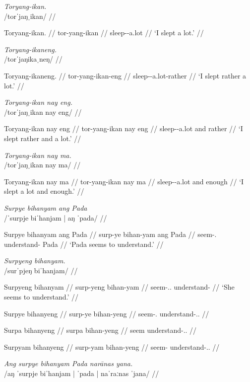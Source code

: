 \documentclass[12pt,a4paper]{scrartcl}
\newcommand{\TsgF}{{\Tsg}.{\F}}
\begin{document}
\ex\begingl
\glpreamble \textit{Toryang-ikan.} \\
	/torˈjaŋˌikan/ //

\gla Toryang-ikan. //
\glb tor-yang-ikan //
\glc sleep-\Fsg{}-a.lot //
\glft `I slept a lot.' //
\endgl\xe

\ex\begingl
\glpreamble \textit{Toryang-ikaneng.} \\
	/torˈjaŋikaˌneŋ/ //

\gla Toryang-ikaneng. //
\glb tor-yang-ikan-eng //
\glc sleep-\Fsg{}-a.lot-rather //
\glft `I slept rather a lot.' //
\endgl\xe

\ex\ljudge*\begingl
\glpreamble \textit{Toryang-ikan nay eng.} \\
	/torˈjaŋˌikan nay eng/ //

\gla Toryang-ikan nay eng //
\glb tor-yang-ikan nay eng //
\glc sleep-\Fsg{}-a.lot and rather //
\glft `I slept rather and a lot.' //
\endgl\xe

\ex\ljudge*\begingl
\glpreamble \textit{Toryang-ikan nay ma.} \\
	/torˈjaŋˌikan nay ma/ //

\gla Toryang-ikan nay ma //
\glb tor-yang-ikan nay ma //
\glc sleep-\Fsg{}-a.lot and enough //
\glft `I slept a lot and enough.' //
\endgl\xe

\ex\begingl
\glpreamble \textit{Surpye bihanyam ang Pada} \\
	/ˈsurpje biˈhanjam | aŋ ˈpada/ //

\gla Surpye bihanyam ang Pada //
\glb surp-ye bihan-yam ang Pada //
\glc seem-\TsgF{} understand-\Ptcp{} \Aarg{} Pada //
\glft `Pada seems to understand.' //
\endgl\xe

\pex
\a\begingl
\glpreamble \textit{Surpyeng bihanyam.} \\
	/surˈpjeŋ biˈhanjam/ //

\gla Surpyeng bihanyam //
\glb surp-yeng bihan-yam //
\glc seem-\TsgF{}.\Aarg{} understand-\Ptcp{} //
\glft `She seems to understand.' //
\endgl

\a\ljudge*\begingl
\gla Surpye bihanyeng //
\glb surp-ye bihan-yeng //
\glc seem-\TsgF{} understand-\TsgF{}.\Aarg{} //
\endgl

\a\ljudge*\begingl
\gla Surpa bihanyeng //
\glb surpa bihan-yeng //
\glc seem understand-\TsgF{}.\Aarg{} //
\endgl

\a\ljudge*\begingl
\gla Surpyam bihanyeng //
\glb surp-yam bihan-yeng //
\glc seem-\Ptcp{} understand-\TsgF{}.\Aarg{} //
\endgl
\xe

\pex
\a\begingl
\glpreamble \textit{Ang surpye bihanyam Pada narānas yana.} \\
	/aŋ ˈsurpje biˈhanjam | ˈpada | naˈraːnas ˈjana/ //
\end{document}
